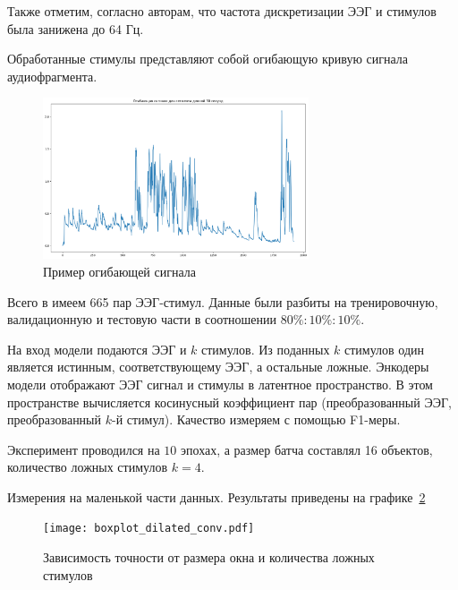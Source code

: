 \documentclass{article}
\begin{document}
    Также отметим, согласно авторам, что частота дискретизации ЭЭГ и стимулов была занижена до 64 Гц.

    Обработанные стимулы представляют собой огибающую кривую сигнала аудиофрагмента. 
    \begin{figure}[h]
	\centering
	\includegraphics[width=0.7\textwidth]{envelope_example.png}
	\caption{Пример огибающей сигнала}
	\label{dilated_conv}
    \end{figure}

    Всего в имеем 665 пар ЭЭГ-стимул. Данные были разбиты на тренировочную, валидационную и тестовую части в соотношении $80\% : 10\%  : 10\%$. 
    
    На вход модели подаются ЭЭГ и $k$ стимулов. Из поданных $k$ стимулов один является истинным, соответствующему ЭЭГ, а остальные ложные. Энкодеры модели отображают ЭЭГ сигнал и стимулы в латентное пространство. В этом пространстве вычисляется косинусный коэффициент пар (преобразованный ЭЭГ, преобразованный $k$-й стимул). Качество измеряем с помощью F1-меры. 

    Эксперимент проводился на $10$ эпохах, а размер батча составлял 16 объектов, количество ложных стимулов $k=4$. 

    Измерения на маленькой части данных. Результаты приведены на графике~\ref{res} 
    \begin{figure}[h]
	\centering
	\texttt{[image: boxplot\_dilated\_conv.pdf]}
	\caption{Зависимость точности от размера окна и количества ложных стимулов}
	\label{res}
    \end{figure}
    
    


\end{document}
